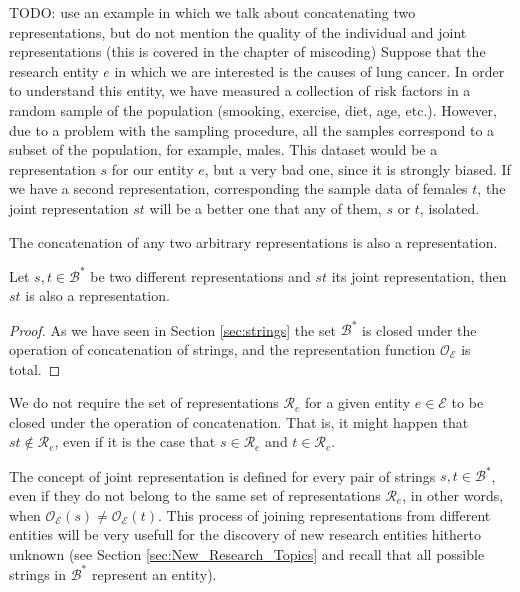 \begin{example}
\label{ex:lung_cancer}
{\color{red} TODO: use an example in which we talk about concatenating two representations, but do not mention the quality of the individual and joint representations (this is covered in the chapter of miscoding)}
Suppose that the research entity $e$ in which we are interested is the causes of lung cancer. In order to understand this entity, we have measured a collection of risk factors in a random sample of the population (smooking, exercise, diet, age, etc.). However, due to a problem with the sampling procedure, all the samples correspond to a subset of the population, for example, males. This dataset would be a representation $s$ for our entity $e$, but a very bad one, since it is strongly biased. If we have a second representation, corresponding the sample data of females $t$, the joint representation $st$ will be a better one that any of them, $s$ or $t$, isolated.
\end{example}

The concatenation of any two arbitrary representations is also a representation.

\begin{proposition}
Let $s, t \in \mathcal{B}^\ast$ be two different representations and $st$ its joint representation, then $st$ is also a representation.
\end{proposition}
\begin{proof}
As we have seen in Section \ref{sec:strings} the set $\mathcal{B}^\ast$ is closed under the operation of concatenation of strings, and the representation function $\mathcal{O}_\mathcal{E}$ is total.
\end{proof}

We do not require the set of representations $\mathcal{R}_e$ for a given entity $e \in \mathcal{E}$ to be closed under the operation of concatenation. That is, it might happen that $st \notin \mathcal{R}_e$, even if it is the case that $s \in \mathcal{R}_e$ and $t \in \mathcal{R}_e$.

The concept of joint representation is defined for every pair of strings $s, t \in \mathcal{B}^\ast$, even if they do not belong to the same set of representations $\mathcal{R}_e$, in other words, when $\mathcal{O}_\mathcal{E} \left( s \right) \neq \mathcal{O}_\mathcal{E} \left( t \right)$. This process of joining representations from different entities will be very usefull for the discovery of new research entities hitherto unknown (see Section \ref{sec:New_Research_Topics} and recall that all possible strings in $\mathcal{B}^\ast$ represent an entity).

